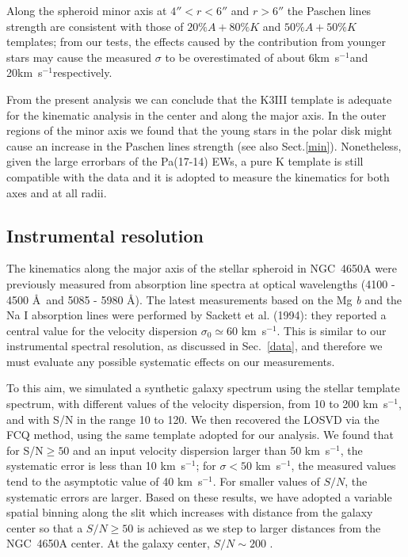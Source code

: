 \documentclass[12pt,preprint]{aastex}
\newcommand{\kms}{\mbox{km~s$^{-1}$}}
\begin{document}
Along the spheroid minor axis at $4''<r<6''$ and $r>6''$ the Paschen
lines strength are consistent with those of $20\%A+80\%K$ and
$50\%A+50\%K$ templates; from our tests, the effects caused by the
contribution from younger stars may cause the measured $\sigma$ to be
overestimated of about 6\kms and 20\kms respectively.

From the present analysis we can conclude that the K3III template is
adequate for the kinematic analysis in the center and along the major
axis. In the outer regions of the minor axis we found that the young
stars in the polar disk might cause an increase in the Paschen lines
strength (see also Sect.\ref{min}). Nonetheless, given the large
errorbars of the Pa(17-14) EWs, a pure K template is still compatible
with the data and it is adopted to measure the kinematics for both
axes and at all radii.


\subsection{Instrumental resolution}

The kinematics along the major axis of the stellar spheroid in
NGC~4650A were previously measured from absorption line spectra at
optical wavelengths (4100 - 4500 \AA\ and 5085 - 5980 \AA). The latest
measurements based on the Mg {\it b} and the Na {\sc I} absorption
lines were performed by Sackett et al. (1994): they reported a central
value for the velocity dispersion $\sigma_0 \simeq 60$ \kms. This is
similar to our instrumental spectral resolution, as discussed in
Sec.~\ref{data}, and therefore we must evaluate any possible systematic
effects on our measurements.

To this aim, we simulated a synthetic galaxy spectrum using the
stellar template spectrum, with different values of the velocity
dispersion, from 10 to 200 \kms, and with S/N in the range 10 to
120. We then recovered the LOSVD via the FCQ method, using the same
template adopted for our analysis. We found that for S/N$ \ge 50$ and
an input velocity dispersion larger than 50 \kms, the systematic error
is less than 10 \kms; for $\sigma < 50$ \kms, the measured values tend
to the asymptotic value of 40 \kms.  For smaller values of $S/N$, the
systematic errors are larger. Based on these results, we have adopted
a variable spatial binning along the slit which increases with
distance from the galaxy center so that a $S/N \ge 50$ is achieved as
we step to larger distances from the NGC~4650A center. At the galaxy
center, $S/N \sim 200$ .
\end{document}
